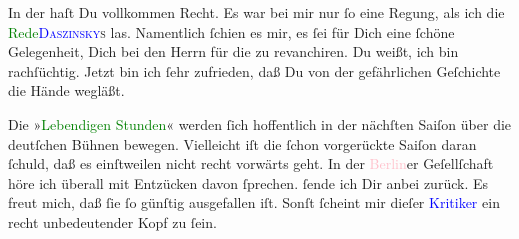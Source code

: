\pstart
           In der \label{K_L03198-4v}\label{K_L03198-4h} haſt Du vollkommen Recht. Es war bei mir nur ſo eine Regung, als ich die \textcolor{green}{Rede}{}\ledrightnote{{$\rightarrow$}\textcolor{green}{[Rede über die Mattachich-Affaire]}}{ }\textsc{\textcolor{blue}{Daszinsky}{}\ledrightnote{\textcolor{blue}{Ignacy Daszyński}}s} las. {\pb}Namentlich ſchien es mir, es ſei für Dich eine
               ſchöne Gelegenheit, Dich bei den Herrn für die \label{K_L03198-143v}\label{K_L03198-143h} zu revanchiren. Du weißt, ich bin rachſüchtig. Jetzt bin ich ſehr zufrieden,
               daß Du von der gefährlichen Geſchichte die Hände wegläßt.\pend
           
\pstart
           Die »\textcolor{green}{Lebendigen Stunden}{}\ledrightnote{\textcolor{green}{Lebendige Stunden. Vier Einakter}}« werden ſich hoffentlich
               in der nächſten Saiſon über die deutſchen Bühnen bewegen. Vielleicht iſt die ſchon
               vorgerückte Saiſon daran ſchuld, daß es einſtweilen nicht recht vorwärts geht. In der
                  \textcolor{pink}{Berlin}{}\ledrightnote{\textcolor{pink}{Berlin}}er Geſellſchaft höre ich überall mit
               Entzücken davon ſprechen. {\pb}\label{K_L03198-7v}\label{K_L03198-7h} ſende ich Dir anbei zurück. Es
               freut mich, daß ſie ſo günſtig ausgefallen iſt. \strikeout{\textcolor{gray}{×}\-\textcolor{gray}{×}\-\textcolor{gray}{×}\-\textcolor{gray}{×}\-\textcolor{gray}{×}\-\textcolor{gray}{×}\-\textcolor{gray}{×}\-\textcolor{gray}{×}\-\textcolor{gray}{×}\-\textcolor{gray}{×}\-\textcolor{gray}{×}\-\textcolor{gray}{×}\-\textcolor{gray}{×}\-\textcolor{gray}{×}\-\textcolor{gray}{×}\-\textcolor{gray}{×}} Sonſt ſcheint mir dieſer \textcolor{blue}{Kritiker}{}\ledrightnote{{$\rightarrow$}\textcolor{blue}{Max Koch}} ein recht unbedeutender Kopf zu ſein.\pend
           

